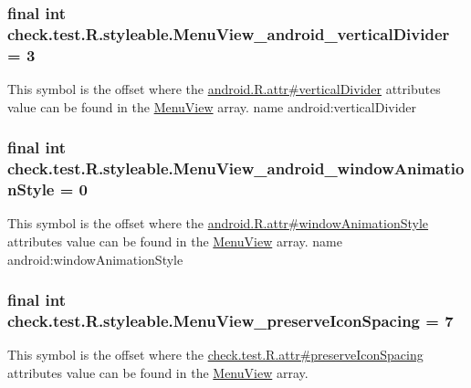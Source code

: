\subsubsection[{Menu\+View\+\_\+android\+\_\+vertical\+Divider}]{\setlength{\rightskip}{0pt plus 5cm}final int check.\+test.\+R.\+styleable.\+Menu\+View\+\_\+android\+\_\+vertical\+Divider = 3\hspace{0.3cm}{\ttfamily [static]}}\label{classcheck_1_1test_1_1_r_1_1styleable_a32c0f0f19e2ec8e866a3c03c63f95680}
This symbol is the offset where the \hyperlink{}{android.\+R.\+attr\#vertical\+Divider} attribute\textquotesingle{}s value can be found in the \hyperlink{classcheck_1_1test_1_1_r_1_1styleable_acb1b5275ffcfc132a3221b157fed1ff8}{Menu\+View} array.  name android\+:vertical\+Divider \hypertarget{classcheck_1_1test_1_1_r_1_1styleable_ada6890b4f29ec20b02e8c982e454986d}{}
\subsubsection[{Menu\+View\+\_\+android\+\_\+window\+Animation\+Style}]{\setlength{\rightskip}{0pt plus 5cm}final int check.\+test.\+R.\+styleable.\+Menu\+View\+\_\+android\+\_\+window\+Animation\+Style = 0\hspace{0.3cm}{\ttfamily [static]}}\label{classcheck_1_1test_1_1_r_1_1styleable_ada6890b4f29ec20b02e8c982e454986d}
This symbol is the offset where the \hyperlink{}{android.\+R.\+attr\#window\+Animation\+Style} attribute\textquotesingle{}s value can be found in the \hyperlink{classcheck_1_1test_1_1_r_1_1styleable_acb1b5275ffcfc132a3221b157fed1ff8}{Menu\+View} array.  name android\+:window\+Animation\+Style \hypertarget{classcheck_1_1test_1_1_r_1_1styleable_ad1b55b20b2ab6b61d05dd41ed2312ff2}{}
\subsubsection[{Menu\+View\+\_\+preserve\+Icon\+Spacing}]{\setlength{\rightskip}{0pt plus 5cm}final int check.\+test.\+R.\+styleable.\+Menu\+View\+\_\+preserve\+Icon\+Spacing = 7\hspace{0.3cm}{\ttfamily [static]}}\label{classcheck_1_1test_1_1_r_1_1styleable_ad1b55b20b2ab6b61d05dd41ed2312ff2}
This symbol is the offset where the \hyperlink{classcheck_1_1test_1_1_r_1_1attr_ae85e01112339734f60777fb376eb7e67}{check.\+test.\+R.\+attr\#preserve\+Icon\+Spacing} attribute\textquotesingle{}s value can be found in the \hyperlink{classcheck_1_1test_1_1_r_1_1styleable_acb1b5275ffcfc132a3221b157fed1ff8}{Menu\+View} array.


